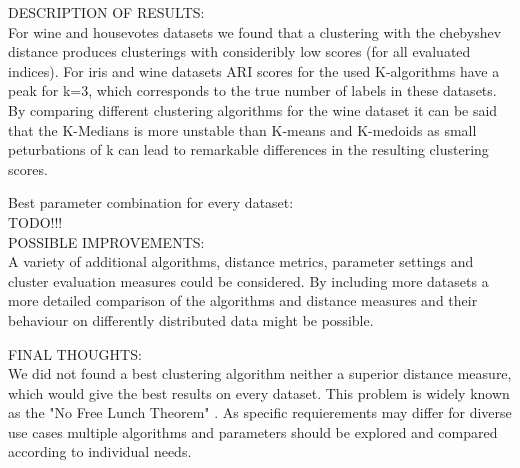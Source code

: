 DESCRIPTION OF RESULTS: \\ 

For wine and housevotes datasets we found that a clustering with the chebyshev distance produces clusterings with consideribly low scores (for all evaluated indices). 
For iris and wine datasets ARI scores for the used K-algorithms have a peak for k=3, which corresponds to the true number of labels in these datasets.  
By comparing different clustering algorithms for the wine dataset it can be said that the K-Medians is more unstable than K-means and K-medoids as small peturbations of k can lead to remarkable differences in the resulting clustering scores. 

Best parameter combination for every dataset:\\
TODO!!! \\ 


POSSIBLE IMPROVEMENTS:\\
A variety of additional algorithms, distance metrics, parameter settings and cluster evaluation measures could be considered. By including more datasets a more detailed comparison of the algorithms and distance measures and their behaviour on differently distributed data might be possible. 

FINAL THOUGHTS: \\

We did not found a best clustering algorithm neither a superior distance measure, which would give the best results on every dataset. This problem is widely known as the "No Free Lunch Theorem" \cite{nofreelunch}. As specific requierements may differ for diverse use cases multiple algorithms and parameters should be explored and compared according to individual needs. 